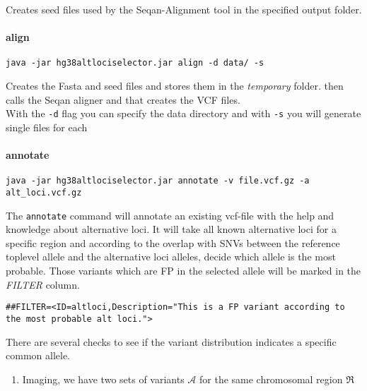 \documentclass[10pt,a4paper]{article}
\begin{document}
Creates seed files used by the Seqan-Alignment tool in the specified output folder.

\paragraph*{align}
\begin{verbatim}
java -jar hg38altlociselector.jar align -d data/ -s
\end{verbatim}

Creates the Fasta and seed files and stores them in the \textit{temporary} folder. then calls the Seqan aligner and that creates the VCF files.\\
With the \texttt{-d} flag you can specify the data directory and with \texttt{-s} you will generate single files for each 

\paragraph*{annotate}
\begin{verbatim}
java -jar hg38altlociselector.jar annotate -v file.vcf.gz -a alt_loci.vcf.gz
\end{verbatim}

The \texttt{annotate} command will annotate an existing vcf-file with the help and knowledge about alternative loci. It will take all known alternative loci for a specific region and according to the overlap with SNVs between the reference toplevel allele and the alternative loci alleles, decide which allele is the most probable. Those variants which are FP in the selected allele will be marked in the \textit{FILTER} column.
\begin{verbatim}
##FILTER=<ID=altloci,Description="This is a FP variant according to the most probable alt loci.">
\end{verbatim}


There are several checks to see if the variant distribution indicates a specific common allele.
\begin{enumerate}
\item Imaging, we have two sets of variants $\mathcal{A}$ for the same chromosomal region $\Re$
\end{enumerate}
\end{document}
